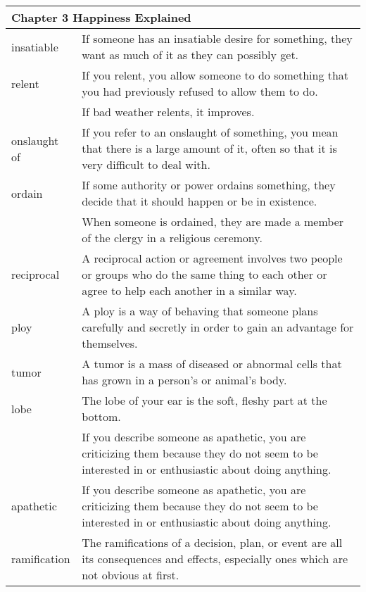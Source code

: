 \documentclass{article}
\begin{document}
\begin{center}
\begin{longtable}{|l|p{7.8cm}|}
\hline
\multicolumn{2}{|l|}{\textbf{Chapter 3 Happiness Explained}}\\
\hline
insatiable
&
If someone has an insatiable desire for something, they want as much of it as they can possibly get.
\\

\hline
relent
&
If you relent, you allow someone to do something that you had previously refused to allow them to do.
\\

&
If bad weather relents, it improves.
\\

\hline
onslaught of
&
If you refer to an onslaught of something, you mean that there is a large amount of it, often so that it is very difficult to deal with.
\\

\hline
ordain
&
If some authority or power ordains something, they decide that it should happen or be in existence.
\\

&
When someone is ordained, they are made a member of the clergy in a religious ceremony.
\\

\hline
reciprocal
&
A reciprocal action or agreement involves two people or groups who do the same thing to each other or agree to help each another in a similar way.
\\

\hline
ploy
&
A ploy is a way of behaving that someone plans carefully and secretly in order to gain an advantage for themselves.
\\

\hline
tumor
&
A tumor is a mass of diseased or abnormal cells that has grown in a person's or animal's body.
\\

\hline
lobe
&
The lobe of your ear is the soft, fleshy part at the bottom.
\\

&
If you describe someone as apathetic, you are criticizing them because they do not seem to be interested in or enthusiastic about doing anything.
\\

\hline
apathetic
&
If you describe someone as apathetic, you are criticizing them because they do not seem to be interested in or enthusiastic about doing anything.
\\

\hline
ramification
&
The ramifications of a decision, plan, or event are all its consequences and effects, especially ones which are not obvious at first.
\\


\end{longtable}
\end{center}
\end{document}
